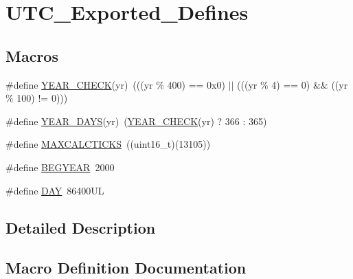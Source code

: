 \hypertarget{group___u_t_c___exported___defines}{}\section{U\+T\+C\+\_\+\+Exported\+\_\+\+Defines}
\label{group___u_t_c___exported___defines}
\subsection*{Macros}
\begin{DoxyCompactItemize}
\item 
\#define \mbox{\hyperlink{group___u_t_c___exported___defines_ga2706620e1bea7ddb1daf12f68f797912}{Y\+E\+A\+R\+\_\+\+C\+H\+E\+CK}}(yr)~(((yr \% 400) == 0x0) $\vert$$\vert$ (((yr \% 4) == 0) \&\& ((yr \% 100) != 0)))
\item 
\#define \mbox{\hyperlink{group___u_t_c___exported___defines_gab977d5f6948f6ceb1089db428ce032b3}{Y\+E\+A\+R\+\_\+\+D\+A\+YS}}(yr)~(\mbox{\hyperlink{group___u_t_c___exported___defines_ga2706620e1bea7ddb1daf12f68f797912}{Y\+E\+A\+R\+\_\+\+C\+H\+E\+CK}}(yr) ? 366 \+: 365)
\item 
\#define \mbox{\hyperlink{group___u_t_c___exported___defines_gad3eedff3dce59330c0b2e7f15187901c}{M\+A\+X\+C\+A\+L\+C\+T\+I\+C\+KS}}~((uint16\+\_\+t)(13105))
\item 
\#define \mbox{\hyperlink{group___u_t_c___exported___defines_ga3ea29a9c2112db5d290632f4f2a721de}{B\+E\+G\+Y\+E\+AR}}~2000
\item 
\#define \mbox{\hyperlink{group___u_t_c___exported___defines_ga509a01c55cbe47386fe24602b7c7fda1}{D\+AY}}~86400\+UL
\end{DoxyCompactItemize}


\subsection{Detailed Description}


\subsection{Macro Definition Documentation}
\mbox{\label{group___u_t_c___exported___defines_ga3ea29a9c2112db5d290632f4f2a721de}} 
